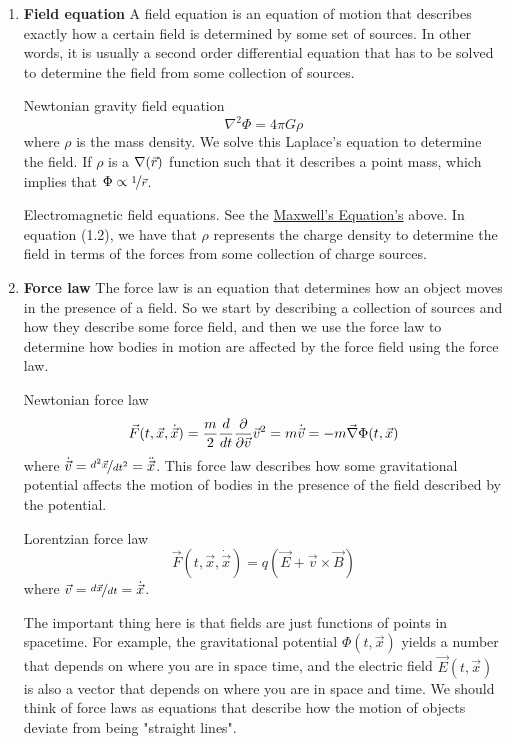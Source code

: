\documentclass{article}
\begin{document}
 		\begin{enumerate}
 			\item \textbf{Field equation}
 				\subitem A field equation is an equation of motion that describes exactly how a certain field is determined by some set of sources. In other words, it is usually a second order differential equation that has to be solved to determine the field from some collection of sources. 
 			\begin{exmp}
 				Newtonian gravity field equation
 				$$ \nabla^2 \Phi = 4\pi G \rho$$
 				where $\rho$ is the mass density. We solve this Laplace's equation to determine the field. If $\rho$ is a $\nabla(\vec{r})$ function such that it describes a point mass, which implies that
 				$\Phi \propto \nicefrac{1}{\vec{r}}$.
 			\end{exmp}
	 		\begin{exmp}
	 			Electromagnetic field equations. See the \hyperref[eq:Maxwell]{Maxwell's Equation's} above. In equation (1.2), we have that $\rho$ represents the charge density to determine the field in terms of the forces from some collection of charge sources.
	 		\end{exmp}
 		\pagebreak
 			\item \textbf{Force law}
 			\subitem The force law is an equation that determines how an object moves in the presence of a field. So we start by describing a collection of sources and how they describe some force field, and then we use the force law to determine how bodies in motion are affected by the force field using the force law.
 			\begin{exmp}
 				Newtonian force law
 				$$ \vec{F}(t, \vec{x}, \dot{\vec{x}}) = \frac{m}{2}\frac{d}{dt} \frac{\partial}{\partial \vec{v}}\vec{v}^2 = m \dot{\vec{v}} =- m \vec{\nabla} \Phi(t,\vec{x}) $$
 				where $\dot{\vec{v}} = \nicefrac{d^2 \vec{x}}{dt^2} = \ddot{\vec{x}}$. This force law describes how some gravitational potential affects the motion of bodies in the presence of the field described by the potential.
 			\end{exmp}
 			\begin{exmp}
 				Lorentzian force law
 				$$ \vec{F} \left(t, \vec{x}, \dot{\vec{x}}\right)=q (\vec{E} + \vec{v} \times \vec{B} )$$
 				where $\vec{v} = \nicefrac{d\vec{x}}{dt} = \dot{\vec{x}}$.
 			\end{exmp}
 			The important thing here is that fields are just functions of points in spacetime. For example, the gravitational potential $\Phi (t, \vec{x})$ yields a number that depends on where you are in space time, and the electric field $\vec{E} (t, \vec{x})$ is also a vector that depends on where you are in space and time. We should think of force laws as equations that describe how the motion of objects deviate from being "straight lines". 
 		\end{enumerate}
\end{document}
